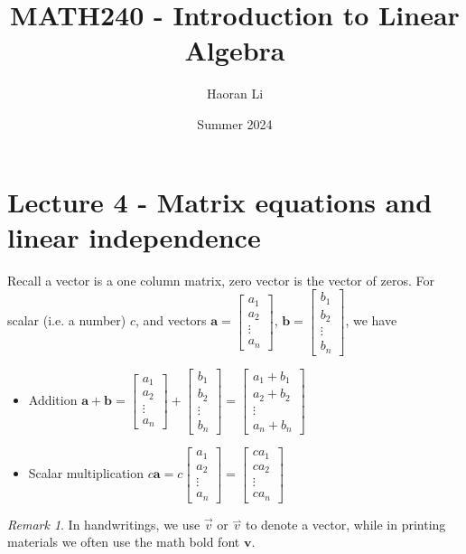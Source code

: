\documentclass{beamer}
\title{MATH240 - Introduction to Linear Algebra}
\author{Haoran Li}
\institute[UMD]{University of Maryland, College Park}
\date{Summer 2024}
\theoremstyle{definition}
\theoremstyle{remark}
\newtheorem*{remark}{Remark}
\begin{document}
\maketitle

\section{Lecture 4 - Matrix equations and linear independence}

\begin{frame}[t]
Recall a vector is a one column matrix, zero vector is the vector of zeros. For scalar (i.e. a number) $c$, and vectors $\mathbf a=\begin{bmatrix}
a_1\\a_2\\\vdots\\a_n
\end{bmatrix}$, $\mathbf b=\begin{bmatrix}
b_1\\b_2\\\vdots\\b_n
\end{bmatrix}$, we have\pause
\begin{itemize}
\item Addition $\mathbf a+\mathbf b=\begin{bmatrix}
a_1\\a_2\\\vdots\\a_n
\end{bmatrix}+\begin{bmatrix}
b_1\\b_2\\\vdots\\b_n
\end{bmatrix}=\begin{bmatrix}
a_1+b_1\\a_2+b_2\\\vdots\\a_n+b_n
\end{bmatrix}$\pause
\item Scalar multiplication $c \mathbf  a=c\begin{bmatrix}
a_1\\a_2\\\vdots\\a_n
\end{bmatrix}=\begin{bmatrix}
ca_1\\ca_2\\\vdots\\ca_n
\end{bmatrix}$
\end{itemize}
\pause
\begin{remark}
In handwritings, we use $\Vec{v}$ or $\overset{\rightharpoonup}{v}$ to denote a vector, while in printing materials we often use the math bold font $\mathbf v$.
\end{remark}
\end{frame}
\end{document}
